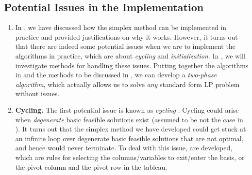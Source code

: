 \subsection{Potential Issues in the Implementation}
\label{subsect:simplex-issues}
\begin{enumerate}
\item In , we have discussed how the
simplex method can be implemented in practice and provided justifications on
why it works. However, it turns out that there are indeed some potential issues
when we are to implement the algorithms in practice, which are about
\emph{cycling} and \emph{initialization}. In , we
will investigate methods for handling these issues. Putting together the
algorithms in  and the methods to be
discussed in , we can develop a \emph{two-phase
algorithm}, which actually allows us to solve \emph{any} standard form LP
problem without issues.

\item \textbf{Cycling.} The first potential issue is known as \emph{cycling}
. Cycling could arise when \emph{degenerate} basic feasible
solutions exist (assumed to be not the case in
). It turns out that the simplex method we
have developed could get stuck at an infinite loop over degenerate basic
feasible solutions that are not optimal, and hence would never terminate. To
deal with this issue,  are developed, which are rules for
selecting the columns/variables to exit/enter the basis, or the pivot column
and the pivot row in the tableau.


\end{enumerate}

